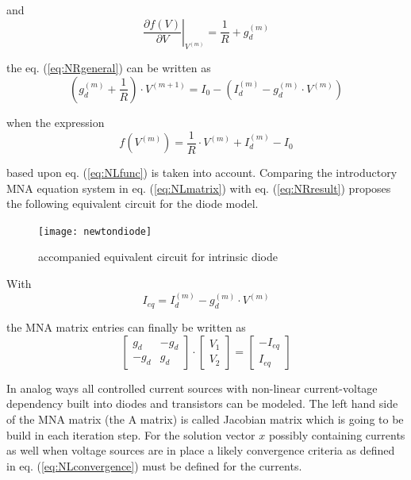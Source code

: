 and
\begin{equation}
\left.\dfrac{\partial f\left(V\right)}{\partial V}\right|_{V^{(m)}} = \dfrac{1}{R} + g_{d}^{(m)}
\end{equation}

the eq. (\ref{eq:NRgeneral}) can be written as
\begin{equation}
\left(g_{d}^{(m)} + \dfrac{1}{R}\right)\cdot V^{(m+1)} = I_{0} - \left(I_{d}^{(m)} - g_{d}^{(m)}\cdot V^{(m)}\right)
\label{eq:NRresult}
\end{equation}

when the expression
\begin{equation}
f\left(V^{(m)}\right) = \dfrac{1}{R}\cdot V^{(m)} + I_{d}^{(m)} - I_{0}
\end{equation}

based upon eq. (\ref{eq:NLfunc}) is taken into account.  Comparing the
introductory MNA equation system in eq. (\ref{eq:NLmatrix}) with
eq. (\ref{eq:NRresult}) proposes the following equivalent circuit for
the diode model.

\begin{figure}[ht]
\begin{center}
\texttt{[image: newtondiode]}
\end{center}
\caption{accompanied equivalent circuit for intrinsic diode}
\label{fig:AccompaniedModel}
\end{figure}
\FloatBarrier

\label{sec:DCdiode}

With
\begin{equation}
I_{eq} = I_{d}^{(m)} - g_{d}^{(m)}\cdot V^{(m)}
\end{equation}

the MNA matrix entries can finally be written as
\begin{equation}
\begin{bmatrix}
g_{d} & -g_{d}\\
-g_{d} & g_{d}
\end{bmatrix}
\cdot
\begin{bmatrix}
V_{1}\\
V_{2}
\end{bmatrix}
=
\begin{bmatrix}
-I_{eq}\\
I_{eq}
\end{bmatrix}
\end{equation}

In analog ways all controlled current sources with non-linear
current-voltage dependency built into diodes and transistors can be
modeled.  The left hand side of the MNA matrix (the A matrix) is
called Jacobian matrix which is going to be build in each iteration
step.  For the solution vector $x$ possibly containing currents as
well when voltage sources are in place a likely convergence criteria
as defined in eq. (\ref{eq:NLconvergence}) must be defined for the
currents.

